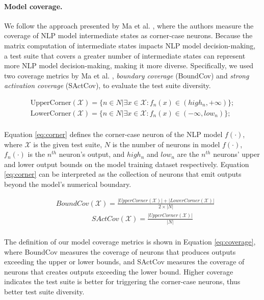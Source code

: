 \paragraph*{Model coverage.}
We follow the approach presented by Ma et al. \cite{ma2018deepgauge},
where the authors measure the coverage of NLP model intermediate states as corner-case neurons.
Because the matrix computation of intermediate states impacts NLP model decision-making, a test suite that covers a greater number of intermediate states can represent more NLP model decision-making, making it more diverse.
Specifically, we used two coverage metrics by Ma et al. \cite{ma2018deepgauge}, \textit{boundary coverage} (BoundCov) and \textit{strong activation coverage} (SActCov), to evaluate the test suite diversity.


\begin{equation}
\begin{split}
    \text{UpperCorner}(\mathcal{X}) = \{n \in N | \exists x \in \mathcal{X}: f_n(x) \in (high_n, +\infty)\}; \\
    \text{LowerCorner}(\mathcal{X}) = \{n \in N | \exists x \in \mathcal{X}: f_n(x) \in (-\infty, low_n)\}; \\
\end{split}
    \label{eq:corner}
\end{equation}


\noindent Equation \ref{eq:corner} defines the corner-case neuron of the NLP model $f(\cdot)$, where $\mathcal{X}$ is the given test suite, $N$ is the number of neurons in model $f(\cdot)$, $f_n(\cdot)$ is the $n^{th}$ neuron's output, and $high_n$ and $low_n$ are the $n^{th}$ neurons' upper and lower output bounds on the model training dataset respectively.
Equation \ref{eq:corner} can be interpreted as the collection of neurons that emit outputs beyond the model's numerical boundary.

\begin{small}
\begin{equation}
\begin{split}
     & BoundCov(\mathcal{X}) = \frac{|UpperCorner(\mathcal{X})| + |LowerCorner(\mathcal{X})| }{2 \times |N|} \\ 
     &\quad  \qquad \qquad  SActCov(\mathcal{X}) = \frac{|UpperCorner(\mathcal{X})|} {|N|} \\ 
\end{split}
    \label{eq:coverage}
\end{equation}
\end{small}
\noindent The definition of our model coverage metrics is shown in Equation \ref{eq:coverage}, where BoundCov measures the coverage of neurons that produces outputs exceeding the upper or lower bounds, and SActCov measures the coverage of neurons that creates outputs exceeding the lower bound.
Higher coverage indicates the test suite is better for triggering the corner-case neurons, thus better test suite diversity.


